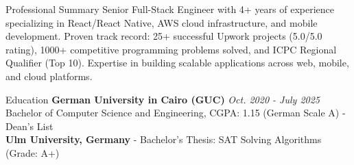 \documentclass{resume}
\begin{document}

\begin{rSection}{Professional Summary}
\vspace{-0.1in}
Senior Full-Stack Engineer with 4+ years of experience specializing in React/React Native, AWS cloud infrastructure, and mobile development. Proven track record: 25+ successful Upwork projects (5.0/5.0 rating), 1000+ competitive programming problems solved, and ICPC Regional Qualifier (Top 10). Expertise in building scalable applications across web, mobile, and cloud platforms.
\end{rSection}


\begin{rSection}{Education}
\vspace{-0.1in}
{\bf German University in Cairo (GUC)} \hfill {\em Oct. 2020 - July 2025} \\
Bachelor of Computer Science and Engineering, CGPA: 1.15 (German Scale A) - Dean's List \\
{\bf Ulm University, Germany} - Bachelor's Thesis: SAT Solving Algorithms (Grade: A+)
\end{rSection}

\end{document}
